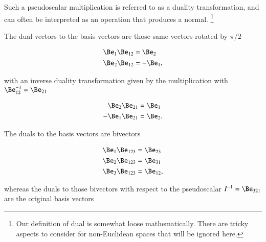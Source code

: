 %
%


Such a pseudoscalar multiplication is referred to as a duality transformation, and can often be interpreted as an operation that produces a normal.
\footnote{Our definition of dual is somewhat loose mathematically.  There are tricky aspects to consider for non-Euclidean spaces that will be ignored here.}

The dual vectors to the  basis vectors are those same vectors rotated by \( \pi/2 \)

\begin{dmath}\label{eqn:definitions:360}
\begin{aligned}
\Be_1 \Be_{12} &= \Be_2 \\
\Be_2 \Be_{12} &= -\Be_1,
\end{aligned}
\end{dmath}

with an inverse duality transformation given by the multiplication with \( \Be_{12}^{-1} = \Be_{21} \)

\begin{dmath}\label{eqn:definitions:440}
\begin{aligned}
\Be_2 \Be_{21} &= \Be_1 \\
-\Be_1 \Be_{21} &= \Be_2.
\end{aligned}
\end{dmath}

The  duals to the basis vectors are bivectors

\begin{dmath}\label{eqn:definitions:380}
\begin{aligned}
\Be_1 \Be_{123} &= \Be_{23} \\
\Be_2 \Be_{123} &= \Be_{31} \\
\Be_3 \Be_{123} &= \Be_{12},
\end{aligned}
\end{dmath}

whereas the duals to those bivectors with respect to the pseudoscalar \( I^{-1} = \Be_{321} \) are the original basis vectors

